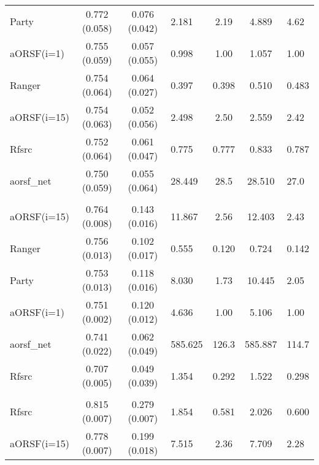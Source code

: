 \documentclass[twoside,11pt]{article}\usepackage[]{graphicx}\usepackage[]{color}
\newenvironment{knitrout}{}{} %
\begin{document}
\begin{knitrout}
\begin{longtable}{lcclccl}
\endfoot
\bottomrule
\endlastfoot
\addlinespace[0.3em]
\hline
\multicolumn{7}{l}{\textit{\textbf{actg}}}\\
\hline
\hspace{1em}Party & 0.772 (0.058) & 0.076 (0.042) & 2.181 & 2.19 & 4.889 & 4.62\\
\hspace{1em}aORSF(i=1) & 0.755 (0.059) & 0.057 (0.055) & 0.998 & 1.00 & 1.057 & 1.00\\
\hspace{1em}Ranger & 0.754 (0.064) & 0.064 (0.027) & 0.397 & 0.398 & 0.510 & 0.483\\
\hspace{1em}aORSF(i=15) & 0.754 (0.063) & 0.052 (0.056) & 2.498 & 2.50 & 2.559 & 2.42\\
\hspace{1em}Rfsrc & 0.752 (0.064) & 0.061 (0.047) & 0.775 & 0.777 & 0.833 & 0.787\\
\hspace{1em}aorsf\_net & 0.750 (0.059) & 0.055 (0.064) & 28.449 & 28.5 & 28.510 & 27.0\\
\addlinespace[0.3em]
\hline
\multicolumn{7}{l}{\textit{\textbf{breast}}}\\
\hline
\hspace{1em}aORSF(i=15) & 0.764 (0.008) & 0.143 (0.016) & 11.867 & 2.56 & 12.403 & 2.43\\
\hspace{1em}Ranger & 0.756 (0.013) & 0.102 (0.017) & 0.555 & 0.120 & 0.724 & 0.142\\
\hspace{1em}Party & 0.753 (0.013) & 0.118 (0.016) & 8.030 & 1.73 & 10.445 & 2.05\\
\hspace{1em}aORSF(i=1) & 0.751 (0.002) & 0.120 (0.012) & 4.636 & 1.00 & 5.106 & 1.00\\
\hspace{1em}aorsf\_net & 0.741 (0.022) & 0.062 (0.049) & 585.625 & 126.3 & 585.887 & 114.7\\
\hspace{1em}Rfsrc & 0.707 (0.005) & 0.049 (0.039) & 1.354 & 0.292 & 1.522 & 0.298\\
\addlinespace[0.3em]
\hline
\multicolumn{7}{l}{\textit{\textbf{colon}}}\\
\hline
\hspace{1em}Rfsrc & 0.815 (0.007) & 0.279 (0.007) & 1.854 & 0.581 & 2.026 & 0.600\\
\hspace{1em}aORSF(i=15) & 0.778 (0.007) & 0.199 (0.018) & 7.515 & 2.36 & 7.709 & 2.28\\

\end{longtable}
\end{knitrout}
\end{document}
